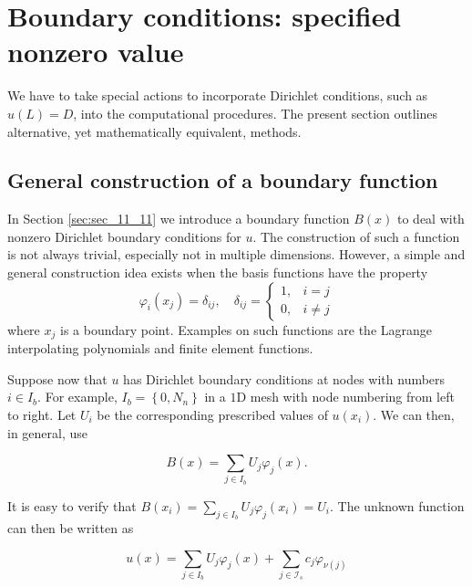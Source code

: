 \documentclass[../main.tex]{subfiles}
\begin{document}
	\chapter{Boundary conditions: specified nonzero value}
\label{chap:chap_14}
\setcounter{page}{90}
\noindent We have to take special actions to incorporate Dirichlet conditions, such as $u(L)=D$, into the computational procedures. The present section outlines alternative, yet mathematically equivalent, methods. \bigbreak
	\section[General construction of a boundary function]{General construction of a boundary function}
		\label{sec:sec_14_1}
		\noindent In Section \ref{sec:sec_11_11} we introduce a boundary function $B(x)$ to deal with nonzero Dirichlet boundary conditions for $u$. The construction of such a function is not always trivial, especially not in multiple dimensions. However, a simple and general construction idea exists when the basis functions have the property
		$$
		\varphi_{i}\left(x_{j}\right)=\delta_{i j}, \quad \delta_{i j}= \begin{cases}1, & i=j \\ 0, & i \neq j\end{cases}
		$$
		where $x_{j}$ is a boundary point. Examples on such functions are the Lagrange interpolating polynomials and finite element functions.
		
		Suppose now that $u$ has Dirichlet boundary conditions at nodes with numbers $i \in I_{b}$. For example, $I_{b}=\left\{0, N_{n}\right\}$ in a $1 \mathrm{D}$ mesh with node numbering from left to right. Let $U_{i}$ be the corresponding prescribed values of $u\left(x_{i}\right)$. We can then, in general, use
	
		\begin{equation}
			\label{eqa179}
			B(x)=\sum_{j \in I_{b}} U_{j} \varphi_{j}(x) .
		\end{equation}
	
		\noindent It is easy to verify that $B\left(x_{i}\right)=\sum_{j \in I_{b}} U_{j} \varphi_{j}\left(x_{i}\right)=U_{i}$.\smallbreak
		The unknown function can then be written as
		
		\begin{equation}
			\label{eqa180}
			u(x)=\sum_{j \in I_{b}} U_{j} \varphi_{j}(x)+\sum_{j \in \mathcal{I}_{s}} c_{j} 	\varphi_{\nu(j)}
		\end{equation}
	
\end{document}
